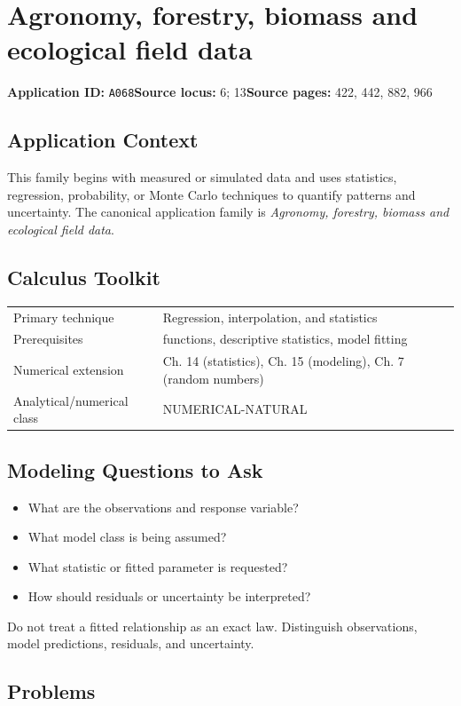 \documentclass[11pt]{book}
\newcommand{\pid}[1]{\texttt{#1}}
\begin{document}
\chapter{Agronomy, forestry, biomass and ecological field data}\label{app:A068}
\textbf{Application ID:} \pid{A068}\quad \textbf{Source locus:} 6; 13\quad \textbf{Source pages:} 422, 442, 882, 966
\section*{Application Context}
This family begins with measured or simulated data and uses statistics, regression, probability, or Monte Carlo techniques to quantify patterns and uncertainty. The canonical application family is \emph{Agronomy, forestry, biomass and ecological field data}.
\section*{Calculus Toolkit}
\begin{tabularx}{\textwidth}{@{}lX@{}}\toprule
Primary technique & Regression, interpolation, and statistics \\
Prerequisites & functions, descriptive statistics, model fitting \\
Numerical extension & Ch. 14 (statistics), Ch. 15 (modeling), Ch. 7 (random numbers) \\
Analytical/numerical class & NUMERICAL-NATURAL \\
\bottomrule\end{tabularx}
\section*{Modeling Questions to Ask}\begin{itemize}
\item What are the observations and response variable?
\item What model class is being assumed?
\item What statistic or fitted parameter is requested?
\item How should residuals or uncertainty be interpreted?
\end{itemize}
\begin{errorbox}Do not treat a fitted relationship as an exact law. Distinguish observations, model predictions, residuals, and uncertainty.\end{errorbox}
\section*{Problems}
\end{document}
